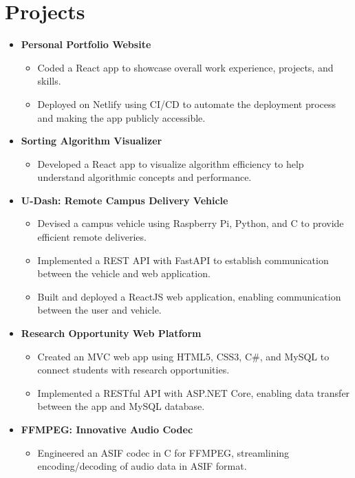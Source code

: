 \documentclass[letterpaper,11pt]{article}
\begin{document}

\section{\textbf{Projects}}
\begin{itemize}[leftmargin=0.05in, label={}]
	\item{
	            \textbf{Personal Portfolio Website}
	            \begin{itemize} [label=$\bullet$]
		            \item{Coded a React app to showcase overall work experience, projects, and skills.}
		            \item {Deployed on Netlify using CI/CD to automate the deployment process and making the app publicly accessible.}
	            \end{itemize}
	      }
	\item{
	            \textbf{Sorting Algorithm Visualizer}
	            \begin{itemize} [label=$\bullet$]
		            \item{Developed a React app to visualize algorithm efficiency to help understand algorithmic concepts and performance.}
	            \end{itemize}
	      }
	\item{
	            \textbf{U-Dash: Remote Campus Delivery Vehicle}
	            \begin{itemize} [label=$\bullet$]
		            \item{Devised a campus vehicle using Raspberry Pi, Python, and C to provide efficient remote deliveries.}
		            \item {Implemented a REST API with FastAPI to establish  communication between the vehicle and web application.}
		            \item{Built and deployed a ReactJS web application, enabling communication between the user and vehicle.}

	            \end{itemize}
	      }
	\item{
	            \textbf{Research Opportunity Web Platform}
	            \begin{itemize} [label=$\bullet$]
		            \item{Created an MVC web app using HTML5, CSS3, C\#, and MySQL to connect students with research opportunities.}
		            \item{Implemented a RESTful API with ASP.NET Core, enabling data transfer between the app and MySQL database.}
	            \end{itemize}
	      }
	\item{
	            \textbf{FFMPEG: Innovative Audio Codec}
	            \begin{itemize} [label=$\bullet$]
		            \item{Engineered an ASIF codec in C for FFMPEG, streamlining encoding/decoding of audio data in ASIF format.}
	            \end{itemize}
	      }

\end{itemize}
\end{document}
